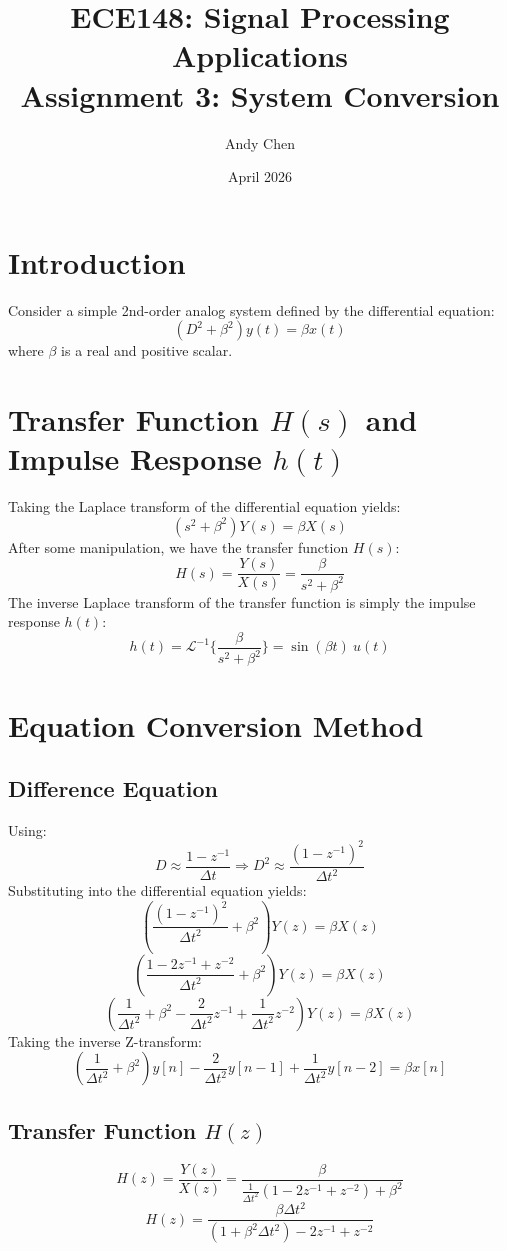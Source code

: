 \documentclass{article}
\title{ECE148: Signal Processing Applications \\\large 
        Assignment 3: System Conversion}
\author{Andy Chen}
\date{April 2026}
\begin{document}
\maketitle

\section{Introduction}
Consider a simple 2nd-order analog system defined by the differential equation:
\[
(D^2 + \beta^2) y(t) = \beta x(t)
\]
where \(\beta\) is a real and positive scalar.

\section{Transfer Function \(H(s)\) and Impulse Response \(h(t)\)}
Taking the Laplace transform of the differential equation yields:
\[
(s^2 + \beta^2)Y(s) = \beta X(s)
\]
After some manipulation, we have the transfer function \(H(s)\):
\[
H(s) = \frac{Y(s)}{X(s)} = \frac{\beta}{s^2 + \beta^2}
\]
The inverse Laplace transform of the transfer function is simply the impulse response \(h(t)\):
\[
h(t) = \mathscr{L}^{-1} \{ \frac{\beta}{s^2 + \beta^2} \} = \sin(\beta t) \ u(t)
\]

\section{Equation Conversion Method}
\subsection*{Difference Equation}
Using:
\[
D \approx \frac{1-z^{-1}}{\Delta t} \Rightarrow D^2 \approx \frac{(1-z^{-1})^2}{\Delta t^2}
\]
Substituting into the differential equation yields:
\[
(\frac{(1-z^{-1})^2}{\Delta t^2} + \beta^2) Y(z) = \beta X(z)
\]
\[
(\frac{1-2z^{-1} + z^{-2}}{\Delta t^2} + \beta^2) Y(z) = \beta X(z)
\]
\[
(\frac{1}{\Delta t^2} + \beta^2 - \frac{2}{\Delta t^2} z^{-1} + \frac{1}{\Delta t^2} z^{-2} ) Y(z) = \beta X(z)
\]
Taking the inverse Z-transform:
\[
(\frac{1}{\Delta t^2} + \beta^2) y[n] - \frac{2}{\Delta t^2} y[n-1]+ \frac{1}{\Delta t^2} y[n-2] = \beta x[n]
\]

\subsection*{Transfer Function \(H(z)\)}
\[
H(z) = \frac{Y(z)}{X(z)} = \frac{\beta}{\frac{1}{\Delta t^2} ( 1-2z^{-1}+z^{-2}) + \beta^2}
\]
\[
H(z) = \frac{\beta \Delta t^2}{(1 + \beta^2 \Delta t^2)- 2z^{-1} + z^{-2}}
\]
\end{document}
